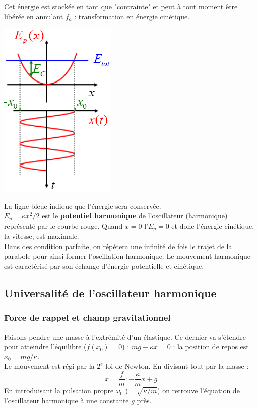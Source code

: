 \documentclass	[11pt, a4paper, openany]{book}
\begin{document}
Cet énergie est stockée en tant que "contrainte" et peut à tout moment être libérée en annulant $f_a$ : transformation en énergie cinétique.
\begin{center}
\includegraphics[scale=0.45]{oo/image3.png}
\end{center}
La ligne bleue indique que l'énergie sera conservée.\\
$E_p = \kappa x^2 / 2$ est le \textbf{potentiel harmonique} de l'oscillateur (harmonique) représenté par le courbe rouge. Quand $x = 0$ l'$E_p = 0$ et donc l'énergie cinétique, la vitesse, est maximale.\\
Dans des condition parfaite, on répètera une infinité de fois le trajet de la parabole pour ainsi former l'oscillation harmonique. Le mouvement harmonique est caractérisé par son échange d'énergie potentielle et cinétique.

\subsection{Universalité de l'oscillateur harmonique}
\subsubsection{Force de rappel et champ gravitationnel}
Faisons pendre une masse à l'extrémité d'un élastique. Ce dernier va s'étendre pour atteindre l'équilibre ($f(x_0)=0$) : $mg - \kappa x = 0$ : la position de repos est $x_0 = mg/\kappa$.\\
Le mouvement est régi par la $2^e$ loi de Newton. En divisant tout par la masse :
\begin{equation}
\ddot{x} = \frac{f}{m} : -\frac{\kappa}{m}x + g
\end{equation}
En introduisant la pulsation propre $\omega_0$ (= $\sqrt{\kappa/m}$) on retrouve l'équation de l'oscillateur harmonique à une constante $g$ près.\\
\end{document}
